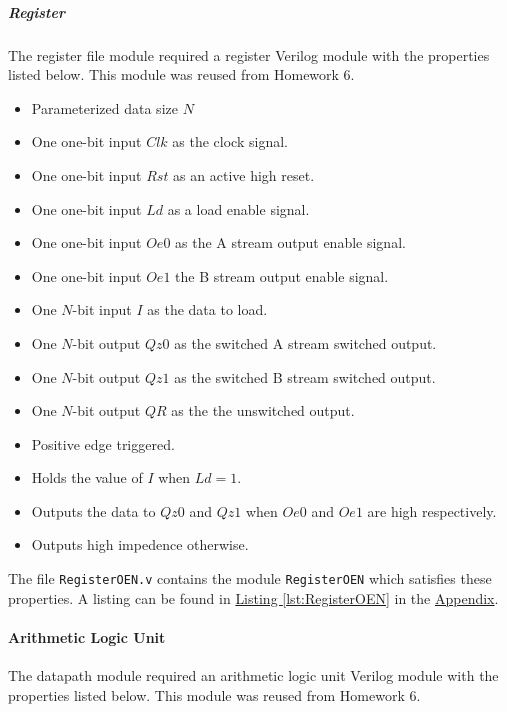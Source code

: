 \subparagraph{Register} \label{subpar:register}

The register file module required a register Verilog module with the properties listed below.
This module was reused from Homework 6.

\begin{itemize}
    \item Parameterized data size $N$
    \item One one-bit input $Clk$ as the clock signal.
    \item One one-bit input $Rst$ as an active high reset.
    \item One one-bit input $Ld$ as a load enable signal.
    \item One one-bit input $Oe0$ as the A stream output enable signal.
    \item One one-bit input $Oe1$ the B stream output enable signal.
    \item One $N$-bit input $I$ as the data to load.
    \item One $N$-bit output $Qz0$ as the switched A stream switched output.
    \item One $N$-bit output $Qz1$ as the switched B stream switched output.
    \item One $N$-bit output $QR$ as the the unswitched output. 
    \item Positive edge triggered.
    \item Holds the value of $I$ when $Ld = 1$.
    \item Outputs the data to $Qz0$ and $Qz1$ when $Oe0$ and $Oe1$ are high respectively.
    \item Outputs high impedence otherwise.
\end{itemize}

The file \verb|RegisterOEN.v| contains the module \verb|RegisterOEN| which satisfies these properties.
A listing can be found in \hyperref[lst:RegisterOEN]{Listing \ref*{lst:RegisterOEN}} in the \hyperref[sec:appendix]{Appendix}.

\paragraph{Arithmetic Logic Unit} \label{par:alu}

The datapath module required an arithmetic logic unit Verilog module with the properties listed below.
This module was reused from Homework 6.

